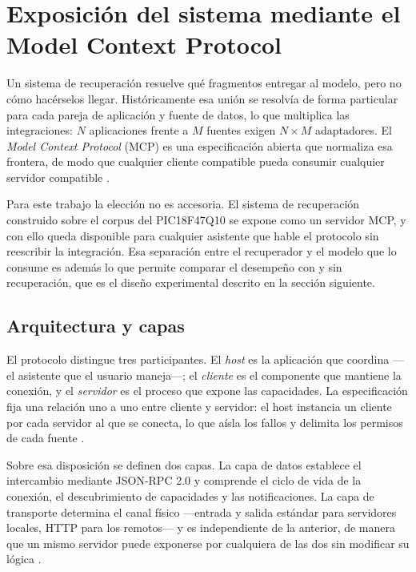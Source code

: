 \section{Exposición del sistema mediante el Model Context Protocol}

Un sistema de recuperación resuelve qué fragmentos entregar al modelo, pero no
cómo hacérselos llegar. Históricamente esa unión se resolvía de forma
particular para cada pareja de aplicación y fuente de datos, lo que multiplica
las integraciones: $N$ aplicaciones frente a $M$ fuentes exigen $N \times M$
adaptadores. El \emph{Model Context Protocol} (MCP) es una especificación
abierta que normaliza esa frontera, de modo que cualquier cliente compatible
pueda consumir cualquier servidor compatible \cite{mcp2026spec}.

Para este trabajo la elección no es accesoria. El sistema de recuperación
construido sobre el corpus del PIC18F47Q10 se expone como un servidor MCP, y
con ello queda disponible para cualquier asistente que hable el protocolo sin
reescribir la integración. Esa separación entre el recuperador y el modelo que
lo consume es además lo que permite comparar el desempeño con y sin
recuperación, que es el diseño experimental descrito en la sección siguiente.

\subsection{Arquitectura y capas}

El protocolo distingue tres participantes. El \emph{host} es la aplicación que
coordina —el asistente que el usuario maneja—; el \emph{cliente} es el
componente que mantiene la conexión, y el \emph{servidor} es el proceso que
expone las capacidades. La especificación fija una relación uno a uno entre
cliente y servidor: el host instancia un cliente por cada servidor al que se
conecta, lo que aísla los fallos y delimita los permisos de cada fuente
\cite{mcp2026spec}.

Sobre esa disposición se definen dos capas. La capa de datos establece el
intercambio mediante JSON-RPC 2.0 y comprende el ciclo de vida de la conexión,
el descubrimiento de capacidades y las notificaciones. La capa de transporte
determina el canal físico —entrada y salida estándar para servidores locales,
HTTP para los remotos— y es independiente de la anterior, de manera que un
mismo servidor puede exponerse por cualquiera de las dos sin modificar su
lógica \cite{mcp2026spec}.

